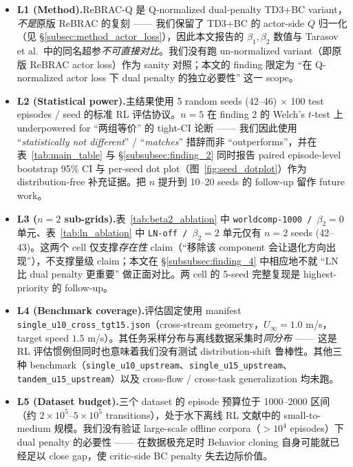 \begin{itemize}
    \item \textbf{L1 (Method).}\quad ReBRAC-Q 是 Q-normalized dual-penalty TD3+BC variant，\emph{不是}原版 ReBRAC \citep{tarasov2023rebrac} 的复刻 —— 我们保留了 TD3+BC 的 actor-side $Q$ 归一化（见 \S\ref{subsec:method_actor_loss}），因此本文报告的 $\beta_1, \beta_2$ 数值与 Tarasov et al.~中的同名超参\emph{不可直接对比}。我们没有跑 un-normalized variant（即原版 ReBRAC actor loss）作为 sanity 对照；本文的 finding 限定为 ``在 Q-normalized actor loss 下 dual penalty 的独立必要性'' 这一 scope。

    \item \textbf{L2 (Statistical power).}\quad 主结果使用 5 random seeds (42--46) $\times$ 100 test episodes / seed 的标准 RL 评估协议。$n = 5$ 在 finding 2 的 Welch's $t$-test 上 underpowered for ``两组等价'' 的 tight-CI 论断 —— 我们因此使用 ``\emph{statistically not different}'' / ``\emph{matches}'' 措辞而非 ``outperforms''，并在表~\ref{tab:main_table} 与 \S\ref{subsubsec:finding_2} 同时报告 paired episode-level bootstrap 95\% CI 与 per-seed dot plot（图~\ref{fig:seed_dotplot}）作为 distribution-free 补充证据。把 $n$ 提升到 10--20 seeds 的 follow-up 留作 future work。

    \item \textbf{L3 ($n = 2$ sub-grids).}\quad 表~\ref{tab:beta2_ablation} 中 \texttt{worldcomp-1000 / $\beta_2 = 0$} 单元、表~\ref{tab:ln_ablation} 中 \texttt{LN-off / $\beta_2 = 2$} 单元仅有 $n = 2$ seeds (42--43)。这两个 cell 仅支撑\emph{存在性} claim（``移除该 component 会让退化方向出现''），不支撑量级 claim；本文在 \S\ref{subsubsec:finding_4} 中相应地不就 ``LN 比 dual penalty 更重要'' 做正面对比。两 cell 的 5-seed 完整复现是 highest-priority 的 follow-up。

    \item \textbf{L4 (Benchmark coverage).}\quad 评估固定使用 manifest \texttt{single\_u10\_cross\_tgt15.json}（cross-stream geometry，$U_\infty = 1.0$ m/s，target speed $1.5$ m/s）。其任务采样分布与离线数据采集时\emph{同分布} —— 这是 RL 评估惯例但同时也意味着我们没有测试 distribution-shift 鲁棒性。其他三种 benchmark（\texttt{single\_u10\_upstream}、\texttt{single\_u15\_upstream}、\texttt{tandem\_u15\_upstream}）以及 cross-flow / cross-task generalization 均未跑。

    \item \textbf{L5 (Dataset budget).}\quad 三个 dataset 的 episode 预算位于 1000--2000 区间（约 $2 \times 10^5$--$5 \times 10^5$ transitions），处于水下离线 RL 文献中的 small-to-medium 规模。我们没有验证 large-scale offline corpora（$> 10^4$ episodes）下 dual penalty 的必要性 —— 在数据极充足时 Behavior cloning 自身可能就已经足以 close gap，使 critic-side BC penalty 失去边际价值。


\end{itemize}

